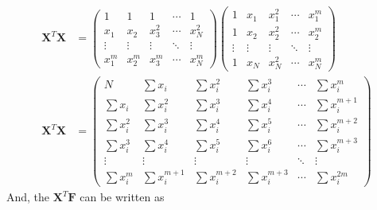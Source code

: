 \documentclass[../../../main.tex]{subfiles}
\begin{document}
\begin{align*}
    \mathbf{X}^T\mathbf{X} & =
    \begin{pmatrix}
        1      & 1      & 1      & \cdots & 1      \\
        x_1    & x_2    & x_3^2  & \cdots & x_N^2  \\
        \vdots & \vdots & \vdots & \ddots & \vdots \\
        x_1^m  & x_2^m  & x_3^m  & \cdots & x_N^m
    \end{pmatrix}
    \begin{pmatrix}
        1      & x_1    & x_1^2  & \cdots & x_1^m  \\
        1      & x_2    & x_2^2  & \cdots & x_2^m  \\
        \vdots & \vdots & \vdots & \ddots & \vdots \\
        1      & x_N    & x_N^2  & \cdots & x_N^m
    \end{pmatrix} \\
    \mathbf{X}^T\mathbf{X} & =
    \begin{pmatrix}
        N            & \sum x_i       & \sum x_i^2     & \sum x_i^3     & \cdots & \sum x_i^m     \\
        \sum x_i     & \sum x_i^2     & \sum x_i^3     & \sum x_i^4     & \cdots & \sum x_i^{m+1} \\
        \sum x_i^2   & \sum x_i^3     & \sum x_i^4     & \sum x_i^5     & \cdots & \sum x_i^{m+2} \\
        \sum x_i^3   & \sum x_i^4     & \sum x_i^5     & \sum x_i^6     & \cdots & \sum x_i^{m+3} \\
        \vdots       & \vdots         & \vdots         & \vdots         & \ddots & \vdots         \\
        \sum x_i^{m} & \sum x_i^{m+1} & \sum x_i^{m+2} & \sum x_i^{m+3} & \cdots & \sum x_i^{2m}
    \end{pmatrix}
\end{align*}
And, the $\mathbf{X}^T \mathbf{F}$ can be written as
\end{document}
